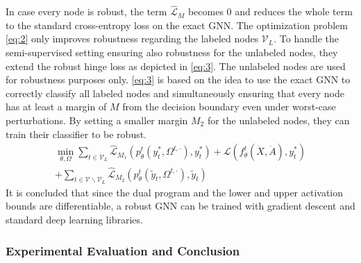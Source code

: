 \documentclass[a4paper,preprint]{sig-alternate}
\begin{document}
In case every node is robust, the term $\mathcal{\hat{L}}_M$ becomes $0$ and reduces the whole term to the standard cross-entropy loss 
on the exact GNN.\newline
The optimization problem \ref{eq:2} only improves robustness regarding the labeled nodes $\mathcal{V}_L$.
To handle the semi-supervised setting ensuring also robustness for the unlabeled nodes, they extend the robust hinge loss
as depicted in \ref{eq:3}. The unlabeled nodes are used for robustness purposes only. 
\ref{eq:3} is based on the idea to use the exact GNN to correctly classify all labeled nodes and simultaneously ensuring that
every node has at least a margin of $M$ from the decision boundary even under worst-case perturbations.
By setting a smaller margin $M_2$ for the unlabeled nodes, they can train their classifier to be robust.
\begin{multline}
\label{eq:3}
    \min_{\theta, \Omega} \sum_{t \in \mathcal{V}_L} \mathcal{\hat{L}}_{M_1} (p_{\theta}^t (y_t^{\ast}, \Omega^{t, \cdot}), y_t^{\ast}) + \mathcal{L} (f_{\theta}^t (\dot{X}, \dot{A}), y_t^{\ast}) \\
    + \sum_{t \in \mathcal{V} \backslash \mathcal{V}_L} \mathcal{\hat{L}}_{M_2} (p_{\theta}^t (\tilde{y}_t, \Omega^{t, \cdot}), \tilde{y}_t)
\end{multline}
It is concluded that since the dual program and the lower and upper activation bounds are differentiable, a robust GNN can be 
trained with gradient descent and standard deep learning libraries.

\subsubsection{Experimental Evaluation and Conclusion}
\end{document}
